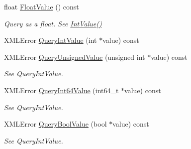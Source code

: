 \begin{DoxyCompactItemize}
\mbox{\label{classtinyxml2_1_1_x_m_l_attribute_a27797b45d21c981257720db94f5f8801}} 
float \mbox{\hyperlink{classtinyxml2_1_1_x_m_l_attribute_a27797b45d21c981257720db94f5f8801}{Float\+Value}} () const
\begin{DoxyCompactList}\small\item\em Query as a float. See \mbox{\hyperlink{classtinyxml2_1_1_x_m_l_attribute_adfa2433f0fdafd5c3880936de9affa80}{Int\+Value()}} \end{DoxyCompactList}\item 
X\+M\+L\+Error \mbox{\hyperlink{classtinyxml2_1_1_x_m_l_attribute_a6d5176260db00ea301c01af8457cd993}{Query\+Int\+Value}} (int $\ast$value) const
\item 
\mbox{\label{classtinyxml2_1_1_x_m_l_attribute_a48a7f3496f1415832e451bd8d09c9cb9}} 
X\+M\+L\+Error \mbox{\hyperlink{classtinyxml2_1_1_x_m_l_attribute_a48a7f3496f1415832e451bd8d09c9cb9}{Query\+Unsigned\+Value}} (unsigned int $\ast$value) const
\begin{DoxyCompactList}\small\item\em See Query\+Int\+Value. \end{DoxyCompactList}\item 
\mbox{\label{classtinyxml2_1_1_x_m_l_attribute_a4e25344d6e4159026be34dbddf1dcac2}} 
X\+M\+L\+Error \mbox{\hyperlink{classtinyxml2_1_1_x_m_l_attribute_a4e25344d6e4159026be34dbddf1dcac2}{Query\+Int64\+Value}} (int64\+\_\+t $\ast$value) const
\begin{DoxyCompactList}\small\item\em See Query\+Int\+Value. \end{DoxyCompactList}\item 
\mbox{\label{classtinyxml2_1_1_x_m_l_attribute_a5f32e038954256f61c21ff20fd13a09c}} 
X\+M\+L\+Error \mbox{\hyperlink{classtinyxml2_1_1_x_m_l_attribute_a5f32e038954256f61c21ff20fd13a09c}{Query\+Bool\+Value}} (bool $\ast$value) const
\begin{DoxyCompactList}\small\item\em See Query\+Int\+Value. \end{DoxyCompactList}\item 
\mbox{\label{classtinyxml2_1_1_x_m_l_attribute_a2aa6e55e8ea03af0609cf6690bff79b9}} 

\end{DoxyCompactItemize}
